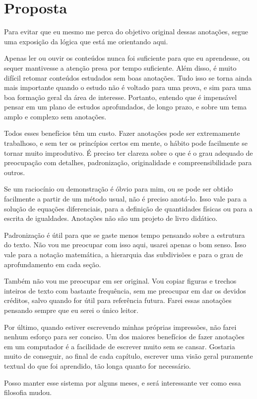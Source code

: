 \chapter*{Proposta}

Para evitar que eu mesmo me perca do objetivo original dessas anotações, segue uma exposição da lógica que está me orientando aqui.

Apenas ler ou ouvir os conteúdos nunca foi suficiente para que eu aprendesse, ou sequer mantivesse a atenção presa por tempo suficiente. Além disso, é muito difícil retomar conteúdos estudados sem boas anotações. Tudo isso se torna ainda mais importante quando o estudo não é voltado para uma prova, e sim para uma boa formação geral da área de interesse. Portanto, entendo que é impensável pensar em um plano de estudos aprofundados, de longo prazo, e sobre um tema amplo e complexo sem anotações.

Todos esses benefícios têm um custo. Fazer anotações pode ser extremamente trabalhoso, e sem ter os princípios certos em mente, o hábito pode facilmente se tornar muito improdutivo. É preciso ter clareza sobre o que é o grau adequado de preocupação com detalhes, padronização, originalidade e compreensibilidade para outros.

Se um raciocínio ou demonstração é óbvio para mim, ou se pode ser obtido facilmente a partir de um método usual, não é preciso anotá-lo. Isso vale para a solução de equações diferenciais, para a definição de quantidades físicas ou para a escrita de igualdades. Anotações não são um projeto de livro didático.

Padronização é útil para que se gaste menos tempo pensando sobre a estrutura do texto. Não vou me preocupar com isso aqui, usarei apenas o bom senso. Isso vale para a notação matemática, a hierarquia das subdivisões e para o grau de aprofundamento em cada seção.

Também não vou me preocupar em ser original. Vou copiar figuras e trechos inteiros de texto com bastante frequência, sem me preocupar em dar os devidos créditos, salvo quando for útil para referência futura. Farei essas anotações pensando sempre que eu serei o único leitor.

Por último, quando estiver escrevendo minhas próprias impressões, não farei nenhum esforço para ser conciso. Um dos maiores benefícios de fazer anotações em um computador é a facilidade de escrever muito sem se cansar. Gostaria muito de conseguir, ao final de cada capítulo, escrever uma visão geral puramente textual do que foi aprendido, tão longa quanto for necessário.

Posso manter esse sistema por alguns meses, e será interessante ver como essa filosofia mudou.
